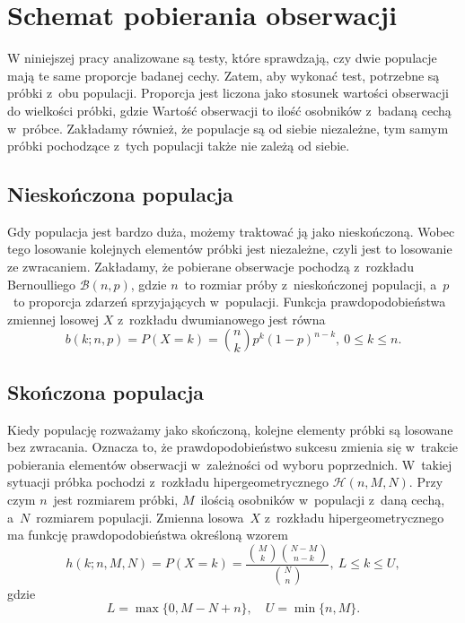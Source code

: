 \chapter{Schemat pobierania obserwacji}
\label{r1}
W niniejszej pracy analizowane są testy, które sprawdzają, czy dwie populacje mają te same proporcje badanej cechy. Zatem, aby wykonać test, potrzebne są próbki z~obu populacji. Proporcja jest liczona jako stosunek wartości obserwacji do wielkości próbki, gdzie Wartość obserwacji to ilość osobników z~badaną cechą w~próbce. Zakładamy również, że populacje są od siebie niezależne, tym samym próbki pochodzące z~tych populacji także nie zależą od siebie. 


\section{Nieskończona populacja}
Gdy populacja jest bardzo duża, możemy traktować ją jako nieskończoną. Wobec tego losowanie kolejnych elementów próbki jest niezależne, czyli jest to losowanie ze zwracaniem. Zakładamy, że pobierane obserwacje pochodzą z~rozkładu Bernoulliego $\mathcal{B}(n,p)$, gdzie $n$~to rozmiar próby z~nieskończonej populacji, a~$p$~to proporcja zdarzeń sprzyjających w~populacji. Funkcja prawdopodobieństwa zmiennej losowej $X$ z~rozkładu dwumianowego jest równa
\begin{equation}
b(k;n,p) = P(X=k) = \binom{n}{k} p^k (1-p)^{n-k},\ 0\leq k\leq n.
\end{equation}

\section{Skończona populacja}
\label{r1:skonczonapopulacja}
Kiedy populację rozważamy jako skończoną, kolejne elementy próbki są losowane bez zwracania. Oznacza to, że prawdopodobieństwo sukcesu zmienia się w~trakcie pobierania elementów obserwacji w~zależności od wyboru poprzednich. W~takiej sytuacji próbka pochodzi z~rozkładu hipergeometrycznego $\mathcal{H}(n,M,N)$. Przy czym $n$~jest rozmiarem próbki, $M$~ilością osobników w~populacji z~daną cechą, a~$N$~rozmiarem populacji. Zmienna losowa~$X$ z~rozkładu hipergeometrycznego ma funkcję prawdopodobieństwa określoną wzorem
\begin{equation}
\label{hg}
h(k;n,M,N) = P(X=k) = \frac{\binom{M}{k} \binom{N-M}{n-k}}{\binom{N}{n}},\ L\leq k\leq U,
\end{equation}
gdzie
\begin{equation}
\label{ograniczenia}
L=\max\{0,M-N+n\},\quad U=\min\{n,M\}.
\end{equation}

